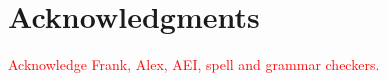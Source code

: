 \section{Acknowledgments}
\textcolor{red}{Acknowledge Frank, Alex, AEI, spell and grammar checkers.}